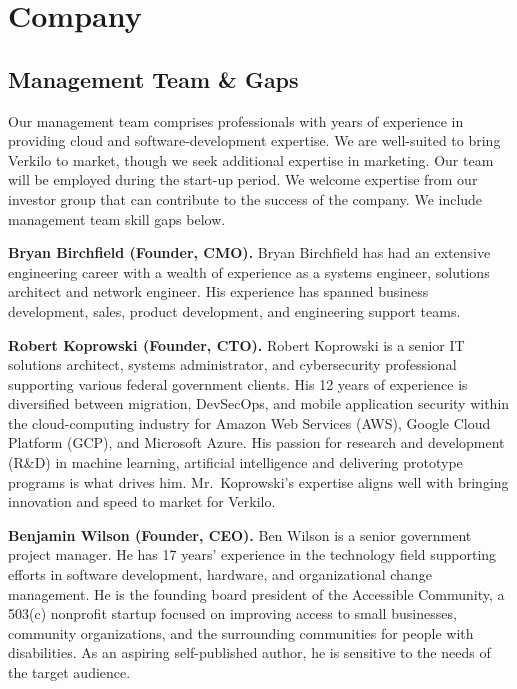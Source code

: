 \documentclass[11pt,openany]{book}
\begin{document}
\hypertarget{company}{%
\chapter{Company}\label{company}}

\hypertarget{management-team-gaps}{%
\section{Management Team \& Gaps}\label{management-team-gaps}}

Our management team comprises professionals with years of experience in
providing cloud and software-development expertise. We are well-suited
to bring Verkilo to market, though we seek additional expertise in
marketing. Our team will be employed during the start-up period. We
welcome expertise from our investor group that can contribute to the
success of the company. We include management team skill gaps below.

\textbf{Bryan Birchfield (Founder, CMO).} Bryan Birchfield has had an
extensive engineering career with a wealth of experience as a systems
engineer, solutions architect and network engineer. His experience has
spanned business development, sales, product development, and
engineering support teams.

\textbf{Robert Koprowski (Founder, CTO).} Robert Koprowski is a senior
IT solutions architect, systems administrator, and cybersecurity
professional supporting various federal government clients. His 12 years
of experience is diversified between migration, DevSecOps, and mobile
application security within the cloud-computing industry for Amazon Web
Services (AWS), Google Cloud Platform (GCP), and Microsoft Azure. His
passion for research and development (R\&D) in machine learning,
artificial intelligence and delivering prototype programs is what drives
him. Mr.~Koprowski's expertise aligns well with bringing innovation and
speed to market for Verkilo.

\textbf{Benjamin Wilson (Founder, CEO).} Ben Wilson is a senior
government project manager. He has 17 years' experience in the
technology field supporting efforts in software development, hardware,
and organizational change management. He is the founding board president
of the Accessible Community, a 503(c) nonprofit startup focused on
improving access to small businesses, community organizations, and the
surrounding communities for people with disabilities. As an aspiring
self-published author, he is sensitive to the needs of the target
audience.
\end{document}
